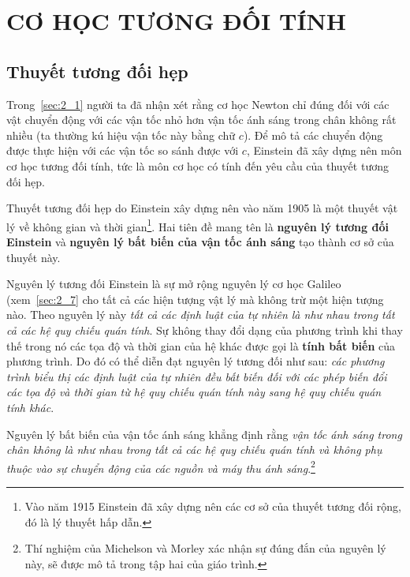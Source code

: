 

\chapter{CƠ HỌC TƯƠNG ĐỐI TÍNH}\label{chap:8}

\section{Thuyết tương đối hẹp}\label{sec:8_1}

Trong~\ref{sec:2_1} người ta đã nhận xét rằng cơ học Newton chỉ đúng đối với các vật chuyển động với các vận tốc nhỏ hơn vận tốc ánh sáng trong chân không rất nhiều (ta thường kú hiệu vận tốc này bằng chữ $c$). Để mô tả các chuyển động được thực hiện với các vận tốc so sánh được với $c$, Einstein đã xây dựng nên môn cơ học tương đối tính, tức là môn cơ học có tính đến yêu cầu của thuyết tương đối hẹp.

Thuyết tương đối hẹp do Einstein xây dựng nên vào năm 1905 là một thuyết vật lý về không gian và thời gian\footnote{Vào năm 1915 Einstein đã xây dựng nên các cơ sở của thuyết tương đối rộng, đó là lý thuyết hấp dẫn.}. Hai tiên đề mang tên là \textbf{nguyên lý tương đối Einstein} và \textbf{nguyên lý bất biến của vận tốc ánh sáng} tạo thành cơ sở của thuyết này.

Nguyên lý tương đối Einstein là sự mở rộng nguyên lý cơ học Galileo (xem~\ref{sec:2_7} cho tất cả các hiện tượng vật lý mà không trừ một hiện tượng nào. Theo nguyên lý này \textit{tất cả các định luật của tự nhiên là như nhau trong tất cả các hệ quy chiếu quán tính}. Sự không thay đổi dạng của phương trình khi thay thế trong nó các tọa độ và thời gian của hệ khác được gọi là \textbf{tính bất biến} của phương trình. Do đó có thể diễn đạt nguyên lý tương đối như sau: \textit{các phương trình biểu thị các định luật của tự nhiên đều bất biến đối với các phép biến đổi các tọa độ và thời gian từ hệ quy chiếu quán tính này sang hệ quy chiếu quán tính khác}.

Nguyên lý bất biến của vận tốc ánh sáng khẳng định rằng \textit{vận tốc ánh sáng trong chân không là như nhau trong tất cả các hệ quy chiếu quán tính và không phụ thuộc vào sự chuyển động của các nguồn và máy thu ánh sáng}.\footnote{Thí nghiệm của Michelson và Morley xác nhận sự đúng đắn của nguyên lý này, sẽ được mô tả trong tập hai của giáo trình.}


